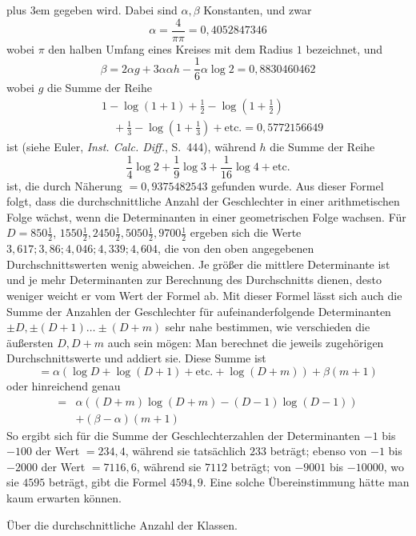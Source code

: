 \begingroup\rightskip=0pt plus 3em\relax
gegeben wird. Dabei sind \(\alpha,\beta\) Konstanten, und zwar
\[\alpha=\frac{4}{\pi\pi}=0{,}4052847346\]
wobei \(\pi\) den halben Umfang eines Kreises mit dem Radius \(1\) bezeichnet, und
\[\beta=2\alpha g+3\alpha\alpha h-\frac16\alpha\log2=0{,}8830460462\]
wobei \(g\) die Summe der Reihe
\[\begin{aligned}&1-\log(1+1)+\frac12-\log(1+\frac12)\\&\quad+\frac13-\log(1+\frac13)+\text{etc.}=0{,}5772156649\end{aligned}\]
ist (siehe Euler, \textit{Inst. Calc. Diff.}, S.\ 444), während \(h\) die Summe der Reihe
\[\frac14\log2+\frac19\log3+\frac1{16}\log4+\text{etc.}\]
ist, die durch Näherung \(=0{,}9375482543\) gefunden wurde. Aus dieser Formel folgt, dass die durchschnittliche Anzahl der Geschlechter in einer arithmetischen Folge wächst, wenn die Determinanten in einer geometrischen Folge wachsen. Für \(D=850\frac12\), \(1550\frac12,2450\frac12,5050\frac12,9700\frac12\) ergeben sich die Werte \(3{,}617;3{,}86;4{,}046;4{,}339;4{,}604\), die von den oben angegebenen Durchschnittswerten wenig abweichen. Je größer die mittlere Determinante ist und je mehr Determinanten zur Berechnung des Durchschnitts dienen, desto weniger weicht er vom Wert der Formel ab. Mit dieser Formel lässt sich auch die Summe der Anzahlen der Geschlechter für aufeinanderfolgende Determinanten \(\pm D,\pm(D+1)\ldots\pm(D+m)\) sehr nahe bestimmen, wie verschieden die äußersten \(D,D+m\) auch sein mögen: Man berechnet die jeweils zugehörigen Durchschnittswerte und addiert sie. Diese Summe ist
\[=\alpha(\log D+\log(D+1)+\text{etc.}+\log(D+m))+\beta(m+1)\]
oder hinreichend genau
\[\begin{aligned}={}&\alpha((D+m)\log(D+m)-(D-1)\log(D-1))\\&+(\beta-\alpha)(m+1)\end{aligned}\]
So ergibt sich für die Summe der Geschlechterzahlen der Determinanten \(-1\) bis \(-100\) der Wert \(=234{,}4\), während sie tatsächlich \(233\) beträgt; ebenso von \(-1\) bis \(-2000\) der Wert \(=7116{,}6\), während sie \(7112\) beträgt; von \(-9001\) bis \(-10000\), wo sie \(4595\) beträgt, gibt die Formel \(4594{,}9\). Eine solche Übereinstimmung hätte man kaum erwarten können.
\par\endgroup
{}

\begin{center}Über die durchschnittliche Anzahl der Klassen.\end{center}


